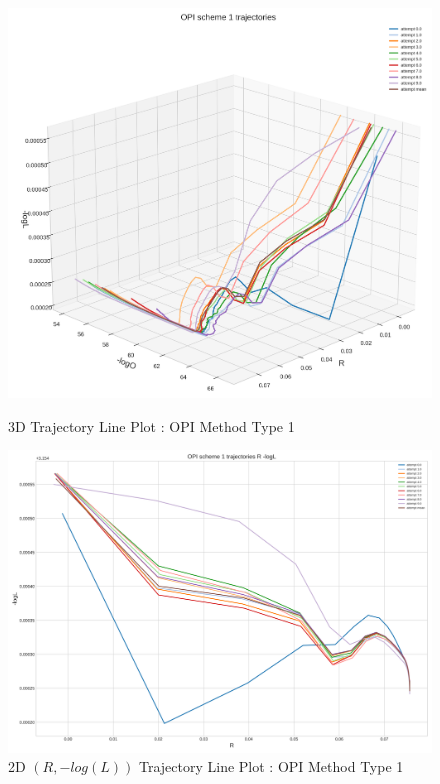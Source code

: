 \begin{figure}[H]
    \centering
    \begin{minipage}[t]{0.45\textwidth}
        \centering
        \includegraphics[width=\textwidth]{images/OPI scheme 1 mean trajectory.png-.png}
        \captionsetup{font=tiny}
        \caption{3D Trajectory Line Plot : OPI Method Type 1}
        \label{fig:cumulative_returns}
    \end{minipage}%
    \begin{minipage}[t]{0.5511\textwidth}
        \centering
        \includegraphics[width=\textwidth]{images/OPI scheme 1 trajectories R -logL.png}
        \captionsetup{font=tiny}
        \caption{2D $(R,-log(L))$ Trajectory Line Plot : OPI Method Type 1}
        \label{fig:corr_matrix_ts_qrt_data}
    \end{minipage}
\end{figure}
